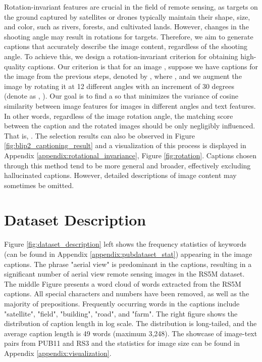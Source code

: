\documentclass[journal]{IEEEtran}
\begin{document}
Rotation-invariant features are crucial in the field of remote sensing, as targets on the ground captured by satellites or drones typically maintain their shape, size, and color, such as rivers, forests, and cultivated lands. However, changes in the shooting angle may result in rotations for targets. Therefore, we aim to generate captions that accurately describe the image content, regardless of the shooting angle. To achieve this, we design a rotation-invariant criterion for obtaining high-quality captions. Our criterion is that for an image , suppose we have  captions for the image from the previous steps, denoted by , where , and we augment the image by rotating it at 12 different angles with an increment of 30 degrees (denote as  , ). Our goal is to find a  so that  minimizes the variance of cosine similarity between image features for images in different angles and text features. In other words, regardless of the image rotation angle, the matching score between the caption and the rotated images should be only negligibly influenced. That is, .  The selection results can also be observed in Figure \ref{fig:blip2_captioning_result} and a visualization of this process is displayed in Appendix \ref{appendix:rotational_invariance}, Figure \ref{fig:rotation}. Captions chosen through this method tend to be more general and broader, effectively excluding hallucinated captions. However, detailed descriptions of image content may sometimes be omitted.

\section{Dataset Description}

Figure \ref{fig:dataset_description} left shows the frequency statistics of keywords (can be found in Appendix \ref{appendix:pubdataset_stat}) appearing in the image captions. The phrase "aerial view" is predominant in the captions, resulting in a significant number of aerial view remote sensing images in the RS5M dataset. The middle Figure presents a word cloud of words extracted from the RS5M captions. All special characters and numbers have been removed, as well as the majority of prepositions. Frequently occurring words in the captions include "satellite", "field", "building", "road", and "farm". The right figure shows the distribution of caption length in log scale. The distribution is long-tailed, and the average caption length is 49 words (maximum 3,248). The showcase of image-text pairs from PUB11 and RS3 and the statistics for image size can be found in Appendix \ref{appendix:visualization}.
\end{document}

